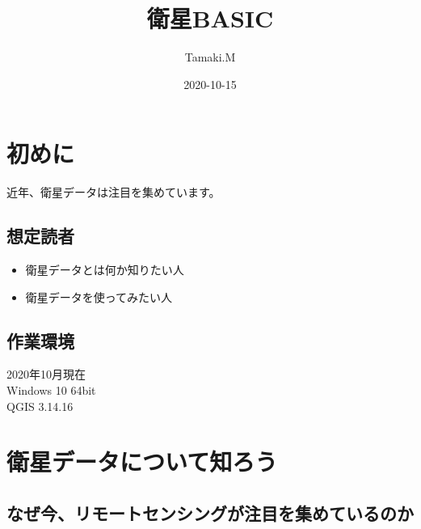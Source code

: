 \documentclass[
]{book}
\title{衛星BASIC}
\author{Tamaki.M}
\date{2020-10-15}
\providecommand{\tightlist}{%
  \setlength{\itemsep}{0pt}\setlength{\parskip}{0pt}}
\begin{document}
\maketitle

{
\setcounter{tocdepth}{1}
\tableofcontents
}
\hypertarget{ux521dux3081ux306b}{%
\chapter*{初めに}\label{ux521dux3081ux306b}}

近年、衛星データは注目を集めています。

\hypertarget{ux60f3ux5b9aux8aadux8005}{%
\section{想定読者}\label{ux60f3ux5b9aux8aadux8005}}

\begin{itemize}
\tightlist
\item
  衛星データとは何か知りたい人
\item
  衛星データを使ってみたい人
\end{itemize}

\hypertarget{ux4f5cux696dux74b0ux5883}{%
\section{作業環境}\label{ux4f5cux696dux74b0ux5883}}

2020年10月現在\\
Windows 10 64bit\\
QGIS 3.14.16

\hypertarget{ux885bux661fux30c7ux30fcux30bfux306bux3064ux3044ux3066ux77e5ux308dux3046}{%
\chapter{衛星データについて知ろう}\label{ux885bux661fux30c7ux30fcux30bfux306bux3064ux3044ux3066ux77e5ux308dux3046}}

\hypertarget{ux306aux305cux4ecaux30eaux30e2ux30fcux30c8ux30bbux30f3ux30b7ux30f3ux30b0ux304cux6ce8ux76eeux3092ux96c6ux3081ux3066ux3044ux308bux306eux304b}{%
\section{なぜ今、リモートセンシングが注目を集めているのか}\label{ux306aux305cux4ecaux30eaux30e2ux30fcux30c8ux30bbux30f3ux30b7ux30f3ux30b0ux304cux6ce8ux76eeux3092ux96c6ux3081ux3066ux3044ux308bux306eux304b}}
\end{document}
